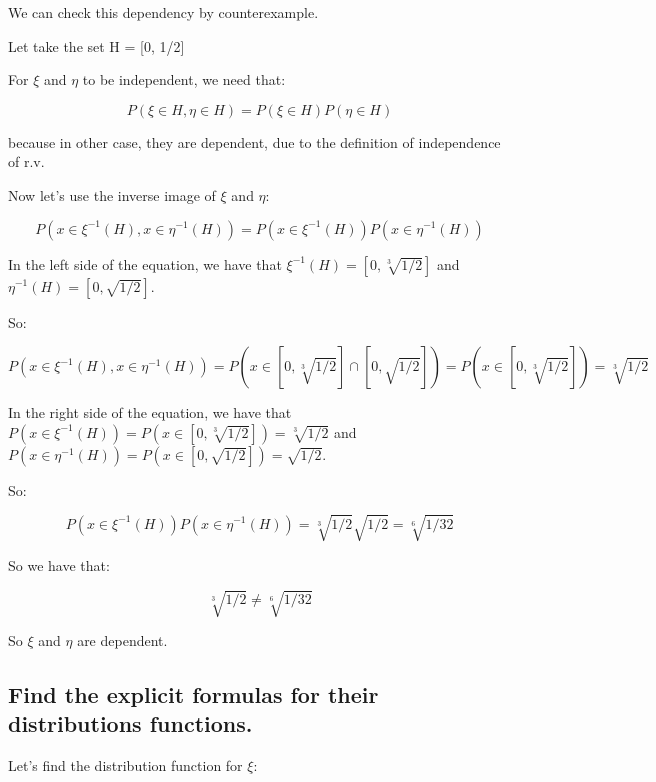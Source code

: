 We can check this dependency by counterexample.

Let take the set H = [0, 1/2]

For $\xi$ and $\eta$ to be independent, we need that:

\begin{equation*}
    P(\xi \in H, \eta \in H) = P(\xi \in H) P(\eta \in H)
\end{equation*}

because in other case, they are dependent, due to the definition
of independence of r.v.

Now let's use the inverse image of $\xi$ and $\eta$:

\begin{equation*}
    P(x \in \xi^{-1}(H), x \in \eta^{-1}(H)) = P(x \in \xi^{-1}(H)) P(x \in \eta^{-1}(H))
\end{equation*}

In the left side of the equation, we have that $\xi^{-1}(H) = [0, \sqrt[3]{1/2}]$ and $\eta^{-1}(H) = [0, \sqrt{1/2}]$.

So:

\begin{equation*}
    P(x \in \xi^{-1}(H), x \in \eta^{-1}(H)) = P(x \in [0, \sqrt[3]{1/2}] \cap [0, \sqrt{1/2}]) = P(x \in [0, \sqrt[3]{1/2}]) = \sqrt[3]{1/2}
\end{equation*}

In the right side of the equation, we have that $P(x \in \xi^{-1}(H)) = P(x \in [0, \sqrt[3]{1/2}]) = \sqrt[3]{1/2}$ and $P(x \in \eta^{-1}(H)) = P(x \in [0, \sqrt{1/2}]) = \sqrt{1/2}$.

So:

\begin{equation*}
    P(x \in \xi^{-1}(H)) P(x \in \eta^{-1}(H)) = \sqrt[3]{1/2} \sqrt{1/2} = \sqrt[6]{1/32}
\end{equation*}

So we have that:

\begin{equation*}
    \sqrt[3]{1/2} \neq \sqrt[6]{1/32}
\end{equation*}

So $\xi$ and $\eta$ are dependent.

\subsection*{Find the explicit formulas for their distributions functions.}

Let's find the distribution function for $\xi$:

